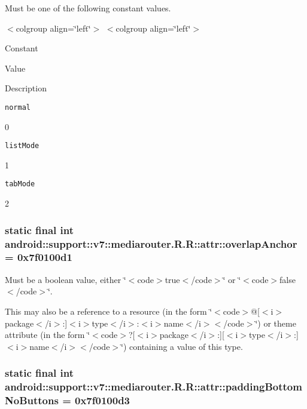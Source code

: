 Must be one of the following constant values. \begin{TabularC}{0}
\hline
\end{TabularC}
$<$colgroup align=\char`\"{}left\char`\"{}$>$ $<$colgroup align=\char`\"{}left\char`\"{}$>$ 

Constant

Value

Description 

{\tt normal}

0

{\tt listMode}

1

{\tt tabMode}

2\hypertarget{classandroid_1_1support_1_1v7_1_1mediarouter_1_1_r_1_1attr_8bd8ce8b45fa53f23a4d256cf3ea0025}{
\subsubsection[{overlapAnchor}]{\setlength{\rightskip}{0pt plus 5cm}static final int android::support::v7::mediarouter.R.R::attr::overlapAnchor = 0x7f0100d1}}
\label{classandroid_1_1support_1_1v7_1_1mediarouter_1_1_r_1_1attr_8bd8ce8b45fa53f23a4d256cf3ea0025}


Must be a boolean value, either \char`\"{}$<$code$>$true$<$/code$>$\char`\"{} or \char`\"{}$<$code$>$false$<$/code$>$\char`\"{}. 

This may also be a reference to a resource (in the form \char`\"{}$<$code$>$@\mbox{[}$<$i$>$package$<$/i$>$:\mbox{]}$<$i$>$type$<$/i$>$:$<$i$>$name$<$/i$>$$<$/code$>$\char`\"{}) or theme attribute (in the form \char`\"{}$<$code$>$?\mbox{[}$<$i$>$package$<$/i$>$:\mbox{]}\mbox{[}$<$i$>$type$<$/i$>$:\mbox{]}$<$i$>$name$<$/i$>$$<$/code$>$\char`\"{}) containing a value of this type. \hypertarget{classandroid_1_1support_1_1v7_1_1mediarouter_1_1_r_1_1attr_e04a62d19d741ffbea39944ab690af93}{
\subsubsection[{paddingBottomNoButtons}]{\setlength{\rightskip}{0pt plus 5cm}static final int android::support::v7::mediarouter.R.R::attr::paddingBottomNoButtons = 0x7f0100d3}}
\label{classandroid_1_1support_1_1v7_1_1mediarouter_1_1_r_1_1attr_e04a62d19d741ffbea39944ab690af93}


